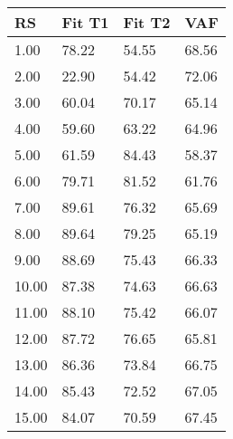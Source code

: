 \begin{tabular}{llll}
RS & Fit T1 & Fit T2 & VAF \\ 
\hline 
 1.00 & 78.22 & 54.55 & 68.56 \\ 
 2.00 & 22.90 & 54.42 & 72.06 \\ 
 3.00 & 60.04 & 70.17 & 65.14 \\ 
 4.00 & 59.60 & 63.22 & 64.96 \\ 
 5.00 & 61.59 & 84.43 & 58.37 \\ 
 6.00 & 79.71 & 81.52 & 61.76 \\ 
 7.00 & 89.61 & 76.32 & 65.69 \\ 
 8.00 & 89.64 & 79.25 & 65.19 \\ 
 9.00 & 88.69 & 75.43 & 66.33 \\ 
10.00 & 87.38 & 74.63 & 66.63 \\ 
11.00 & 88.10 & 75.42 & 66.07 \\ 
12.00 & 87.72 & 76.65 & 65.81 \\ 
13.00 & 86.36 & 73.84 & 66.75 \\ 
14.00 & 85.43 & 72.52 & 67.05 \\ 
15.00 & 84.07 & 70.59 & 67.45 \\ 
\hline 
\end{tabular}